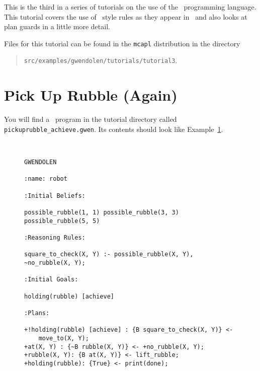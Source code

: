 \label{tutorial:gwendolen:guards}
This is the third in a series of tutorials on the use of the \gwendolen\ programming language.  This tutorial covers the use of \prolog\ style rules as they appear in \gwendolen\ and also looks at plan guards in a little more detail.

Files for this tutorial can be found in the \texttt{mcapl} distribution in the directory 
\begin{quote}
\texttt{src/examples/gwendolen/tutorials/tutorial3}.
\end{quote}

\section{Pick Up Rubble (Again)}

\begin{sloppypar}
You will find a \gwendolen\ program in the tutorial directory called \texttt{pickuprubble\_achieve.gwen}.  Its contents should look like Example~\ref{code:pickuprubble_achieve_tut3}.
\end{sloppypar}
\begin{figure}[htb]
\begin{ourexample}
\label{code:pickuprubble_achieve_tut3} \quad \\
\begin{lstlisting}[basicstyle=\sffamily,style=easslisting,language=Gwendolen]
GWENDOLEN

:name: robot

:Initial Beliefs:

possible_rubble(1, 1) possible_rubble(3, 3) possible_rubble(5, 5)

:Reasoning Rules:

square_to_check(X, Y) :- possible_rubble(X, Y), ~no_rubble(X, Y);

:Initial Goals:

holding(rubble) [achieve]

:Plans:

+!holding(rubble) [achieve] : {B square_to_check(X, Y)} <- 
    move_to(X, Y);
+at(X, Y) : {~B rubble(X, Y)} <- +no_rubble(X, Y);
+rubble(X, Y): {B at(X, Y)} <- lift_rubble;
+holding(rubble): {True} <- print(done);
\end{lstlisting}
\end{ourexample}
\end{figure}

